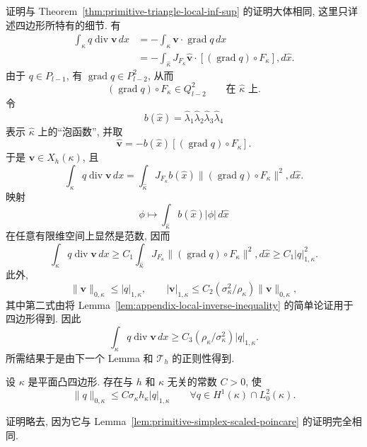 \begin{Proof}
证明与 Theorem~\ref{thm:primitive-triangle-local-inf-sup} 的证明大体相同,
这里只详述四边形所特有的细节. 有
\[
\begin{aligned}
\int_\kappa q\operatorname{div}\mathbf v\,dx
&=-\int_\kappa\mathbf v\cdot\operatorname{grad}q\,dx\\
&=-\int_{\hat\kappa}J_{F_\kappa}\hat{\mathbf v}\cdot
[(\operatorname{grad}q)\circ F_\kappa],d\hat x.
\end{aligned}
\]
由于 $q\in P_{l-1}$, 有 $\operatorname{grad}q\in P_{l-2}^2$, 从而
\[
(\operatorname{grad}q)\circ F_\kappa\in Q_{l-2}^2
\qquad\text{在 }\hat\kappa\text{ 上}.
\]
令
\[
b(\hat x)=\hat\lambda_1\hat\lambda_2\hat\lambda_3\hat\lambda_4
\]
表示 $\hat\kappa$ 上的``泡函数'', 并取
\[
\hat{\mathbf v}=-b(\hat x)[(\operatorname{grad}q)\circ F_\kappa].
\]
于是 $\mathbf v\in X_h(\kappa)$, 且
\[
\int_\kappa q\operatorname{div}\mathbf v\,dx
=\int_{\hat\kappa}J_{F_\kappa}b(\hat x)
\|(\operatorname{grad}q)\circ F_\kappa\|^2,d\hat x.
\]
映射
\[
\phi\longmapsto\int_{\hat\kappa}b(\hat x)|\phi|\,d\hat x
\]
在任意有限维空间上显然是范数, 因而
\[
\int_\kappa q\operatorname{div}\mathbf v\,dx
\geq C_1\int_{\hat\kappa}J_{F_\kappa}
\|(\operatorname{grad}q)\circ F_\kappa\|^2,d\hat x
\geq C_1|q|_{1,\kappa}^2.
\]
此外,
\[
\|\mathbf v\|_{0,\kappa}\leq|q|_{1,\kappa},
\qquad
|\mathbf v|_{1,\kappa}
\leq C_2(\sigma_\kappa^2/\rho_\kappa)\|\mathbf v\|_{0,\kappa},
\]
其中第二式由将 Lemma~\ref{lem:appendix-local-inverse-inequality}
的简单论证用于四边形得到. 因此
\[
\int_\kappa q\operatorname{div}\mathbf v\,dx
\geq C_3(\rho_\kappa/\sigma_\kappa^2)|q|_{1,\kappa}.
\]
所需结果于是由下一个 Lemma 和 $\mathcal T_h$ 的正则性得到.
\end{Proof}

\setcounter{statement}{2}
\renewcommand{\theHstatement}{lemma.\thesection.\arabic{statement}}
\begin{Lemma}\label{lem:primitive-quadrilateral-poincare}
设 $\kappa$ 是平面凸四边形. 存在与 $h$ 和 $\kappa$ 无关的常数 $C>0$, 使
\begin{equation}\label{eq:primitive-quadrilateral-poincare}
\|q\|_{0,\kappa}\leq C\sigma_\kappa h_\kappa|q|_{1,\kappa}
\qquad\forall q\in H^1(\kappa)\cap L_0^2(\kappa).
\end{equation}
\end{Lemma}

证明略去, 因为它与 Lemma~\ref{lem:primitive-simplex-scaled-poincare}
的证明完全相同.

